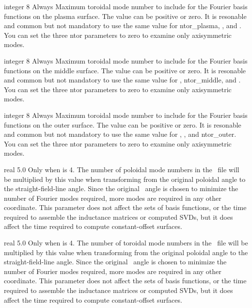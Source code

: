 \myhrule

{integer}
{8}
{Always}
{Maximum toroidal mode number to include for the Fourier basis functions on the plasma surface. The value can be positive or zero.
It is resonable and common but not mandatory to use the same value for {\ttfamily ntor\_plasma}, , and .
You can set the three {\ttfamily ntor} parameters to zero to examine only axisymmetric modes.}

\myhrule

{integer}
{8}
{Always}
{Maximum toroidal mode number to include for the Fourier basis functions on the middle surface. The value can be positive or zero.
It is resonable and common but not mandatory to use the same value for , {\ttfamily ntor\_middle}, and .
You can set the three {\ttfamily ntor} parameters to zero to examine only axisymmetric modes.}

\myhrule

{integer}
{8}
{Always}
{Maximum toroidal mode number to include for the Fourier basis functions on the outer surface. The value can be positive or zero.
It is resonable and common but not mandatory to use the same value for , , and {\ttfamily ntor\_outer}.
You can set the three {\ttfamily ntor} parameters to zero to examine only axisymmetric modes.}

\myhrule

{real}
{5.0}
{Only when  is 4.}
{The number of poloidal mode numbers in the \vmec~file will be multiplied by this value
when transforming from the original poloidal angle to the straight-field-line angle.
Since the original \vmec~angle is chosen to minimize the number of Fourier modes required,
more modes are required in any other coordinate.
This parameter does not affect the sets of basis functions,
or the time required to assemble the inductance matrices or
computed SVDs, but it does affect the time required to compute constant-offset surfaces.
}

\myhrule

{real}
{5.0}
{Only when  is 4.}
{The number of toroidal mode numbers in the \vmec~file will be multiplied by this value
when transforming from the original poloidal angle to the straight-field-line angle.
Since the original \vmec~angle is chosen to minimize the number of Fourier modes required,
more modes are required in any other coordinate.
This parameter does not affect the sets of basis functions,
or the time required to assemble the inductance matrices or
computed SVDs, but it does affect the time required to compute constant-offset surfaces.
}

